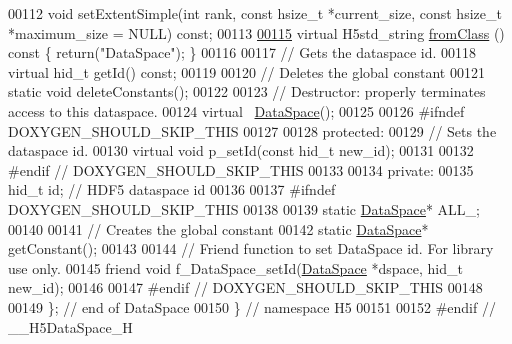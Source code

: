 \begin{DoxyCode}
00112         \textcolor{keywordtype}{void} setExtentSimple(\textcolor{keywordtype}{int} rank, \textcolor{keyword}{const} hsize\_t *current\_size, \textcolor{keyword}{const} hsize\_t *maximum\_size = NULL) \textcolor{keyword}{
      const};
00113 
\hyperlink{class_h5_1_1_data_space_a127e32a992f905e055ba1576d18c7d1f}{00115}         \textcolor{keyword}{virtual} H5std\_string \hyperlink{class_h5_1_1_data_space_a127e32a992f905e055ba1576d18c7d1f}{fromClass} ()\textcolor{keyword}{ const }\{ \textcolor{keywordflow}{return}(\textcolor{stringliteral}{"DataSpace"}); \}
00116 
00117         \textcolor{comment}{// Gets the dataspace id.}
00118         \textcolor{keyword}{virtual} hid\_t getId() \textcolor{keyword}{const};
00119 
00120         \textcolor{comment}{// Deletes the global constant}
00121         \textcolor{keyword}{static} \textcolor{keywordtype}{void} deleteConstants();
00122 
00123         \textcolor{comment}{// Destructor: properly terminates access to this dataspace.}
00124         \textcolor{keyword}{virtual} ~\hyperlink{class_h5_1_1_data_space}{DataSpace}();
00125 
00126 \textcolor{preprocessor}{#ifndef DOXYGEN\_SHOULD\_SKIP\_THIS}
00127 
00128    \textcolor{keyword}{protected}:
00129         \textcolor{comment}{// Sets the dataspace id.}
00130         \textcolor{keyword}{virtual} \textcolor{keywordtype}{void} p\_setId(\textcolor{keyword}{const} hid\_t new\_id);
00131 
00132 \textcolor{preprocessor}{#endif // DOXYGEN\_SHOULD\_SKIP\_THIS}
00133 
00134    \textcolor{keyword}{private}:
00135         hid\_t id;       \textcolor{comment}{// HDF5 dataspace id}
00136 
00137 \textcolor{preprocessor}{#ifndef DOXYGEN\_SHOULD\_SKIP\_THIS}
00138 
00139         \textcolor{keyword}{static} \hyperlink{class_h5_1_1_data_space}{DataSpace}* ALL\_;
00140 
00141         \textcolor{comment}{// Creates the global constant}
00142         \textcolor{keyword}{static} \hyperlink{class_h5_1_1_data_space}{DataSpace}* getConstant();
00143 
00144         \textcolor{comment}{// Friend function to set DataSpace id.  For library use only.}
00145         \textcolor{keyword}{friend} \textcolor{keywordtype}{void} f\_DataSpace\_setId(\hyperlink{class_h5_1_1_data_space}{DataSpace} *dspace, hid\_t new\_id);
00146 
00147 \textcolor{preprocessor}{#endif // DOXYGEN\_SHOULD\_SKIP\_THIS}
00148 
00149 \}; \textcolor{comment}{// end of DataSpace}
00150 \} \textcolor{comment}{// namespace H5}
00151 
00152 \textcolor{preprocessor}{#endif // \_\_H5DataSpace\_H}
\end{DoxyCode}
